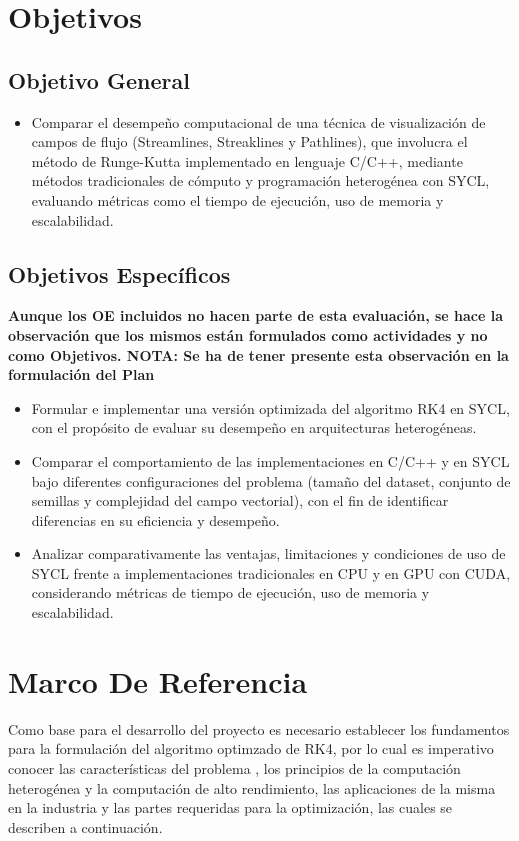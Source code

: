\documentclass[12pt]{article}
\begin{document}
\section{Objetivos}
\subsection{Objetivo General}
\begin{itemize}

	\item Comparar el desempeño computacional de una técnica de visualización de campos de flujo (Streamlines, Streaklines y Pathlines), que involucra el método de Runge-Kutta implementado en lenguaje C/C++, mediante métodos tradicionales de cómputo y programación heterogénea con SYCL, evaluando métricas como el tiempo de ejecución, uso de memoria y escalabilidad.
\end{itemize}

\subsection{Objetivos Específicos}
\textbf{Aunque los OE incluidos no hacen parte de esta evaluación, se hace la observación que los mismos están formulados como actividades y no como Objetivos. NOTA: Se ha de tener presente esta observación en la formulación del Plan}
\begin{itemize}
	\item Formular e implementar una versión optimizada del algoritmo RK4 en SYCL, con el propósito de evaluar su desempeño en arquitecturas heterogéneas.
	\item Comparar el comportamiento de las implementaciones en C/C++ y en SYCL bajo diferentes configuraciones del problema (tamaño del dataset, conjunto de semillas y complejidad del campo vectorial), con el fin de identificar diferencias en su eficiencia y desempeño.
	\item Analizar comparativamente las ventajas, limitaciones y condiciones de uso de SYCL frente a implementaciones tradicionales en CPU y en GPU con CUDA, considerando métricas de tiempo de ejecución, uso de memoria y escalabilidad.
\end{itemize}


\section{Marco De Referencia}

Como base para el desarrollo del proyecto es necesario establecer los fundamentos para la formulación del algoritmo optimzado de RK4, por lo cual es imperativo conocer las características del problema , los principios de la computación heterogénea y la computación de alto rendimiento, las aplicaciones de la misma en la industria y las partes requeridas para la optimización, las cuales se describen a continuación.
\end{document}
